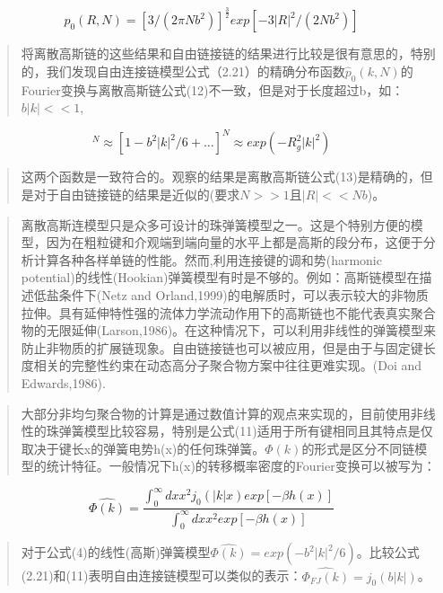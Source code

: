 \documentclass{article}
\begin{document}
\begin{sloppypar}
\begin{CJK}{UTF8}{gkai}
\begin{quotation}
			\end{quotation}
			\begin{equation}
			p_{0}(R,N)=[3/(2\pi Nb^2)]^\frac{3}{2}exp[-3|R|^2/(2Nb^2)]
			\end{equation}
			\begin{quotation}
				将离散高斯链的这些结果和自由链接链的结果进行比较是很有意思的，特别的，我们发现自由连接链模型公式（2.21）的精确分布函数$\hat{p}_{0}(k,N)$的Fourier变换与离散高斯链公式(12)不一致，但是对于长度超过b，如：$b|k|<<1$,
			\end{quotation}
			\begin{equation}
			[j_{0}(b|k|)]^N\approx [1-b^2|k|^2/6+\dots]^N\approx exp(-R_{g}^2|k|^2)
			\end{equation}
			\begin{quotation}
				这两个函数是一致符合的。观察的结果是离散高斯链公式(13)是精确的，但是对于自由链接链的结果是近似的(要求$N>>1$且$|R|<<Nb$)。
			\end{quotation}
			\begin{quotation}
				离散高斯连模型只是众多可设计的珠弹簧模型之一。这是个特别方便的模型，因为在粗粒键和介观端到端向量的水平上都是高斯的段分布，这便于分析计算各种各样单链的性能。然而,利用连接键的调和势(harmonic potential)的线性(Hookian)弹簧模型有时是不够的。例如：高斯链模型在描述低盐条件下(Netz and Orland,1999)的电解质时，可以表示较大的非物质拉伸。具有延伸特性强的流体力学流动作用下的高斯链也不能代表真实聚合物的无限延伸(Larson,1986)。在这种情况下，可以利用非线性的弹簧模型来防止非物质的扩展链现象。自由链接链也可以被应用，但是由于与固定键长度相关的完整性约束在动态高分子聚合物方案中往往更难实现。(Doi and Edwards,1986).
			\end{quotation}
			\begin{quotation}
				大部分非均匀聚合物的计算是通过数值计算的观点来实现的，目前使用非线性的珠弹簧模型比较容易，特别是公式(11)适用于所有键相同且其特点是仅取决于键长x的弹簧电势h(x)的任何珠弹簧。$\varPhi(k)
				$的形式是区分不同链模型的统计特征。一般情况下h(x)的转移概率密度的Fourier变换可以被写为：
			\end{quotation}
			\begin{equation}
			\hat{\varPhi(k)}=\frac{\int_{0}^{\infty} dx x^2j_{0}(|k|x)exp[-\beta h(x)]}{\int_{0}^{\infty} dx x^2exp[-\beta h(x)]} 
			\end{equation}
			\begin{quotation}
				对于公式(4)的线性(高斯)弹簧模型$\hat{\varPhi(k)}=exp(-b^2|k|^2/6)$。比较公式(2.21)和(11)表明自由连接链模型可以类似的表示：$\hat{\varPhi_{FJ}(k)}=j_{0}(b|k|)$。

\end{quotation}
\end{CJK}
\end{sloppypar}
\end{document}
